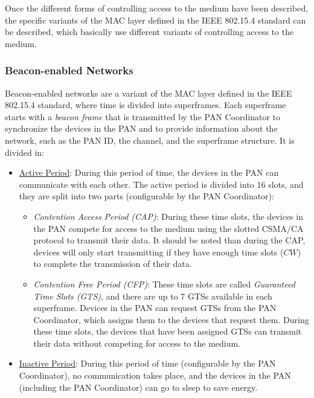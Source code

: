 Once the different forms of controlling access to the medium have been described, the specific variants of the MAC layer defined in the IEEE 802.15.4 standard can be described, which basically use different variants of controlling access to the medium.

\subsubsection{Beacon-enabled Networks}

Beacon-enabled networks are a variant of the MAC layer defined in the IEEE 802.15.4 standard, where time is divided into superframes. Each superframe starts with a \emph{beacon frame} that is transmitted by the PAN Coordinator to synchronize the devices in the PAN and to provide information about the network, such as the PAN ID, the channel, and the superframe structure. It is divided in:
\begin{itemize}
    \item \ul{Active Period}: During this period of time, the devices in the PAN can communicate with each other. The active period is divided into 16 slots, and they are split into two parts (configurable by the PAN Coordinator):
    \begin{itemize}
        \item \emph{Contention Access Period (CAP)}: During these time slots, the devices in the PAN compete for access to the medium using the slotted CSMA/CA protocol to transmit their data. It should be noted than during the CAP, devices will only start transmitting if they have enough time slots ($CW$) to complete the transmission of their data.
        \item \emph{Contention Free Period (CFP)}: These time slots are called \emph{Guaranteed Time Slots (GTS)}, and there are up to 7 GTSs available in each superframe. Devices in the PAN can request GTSs from the PAN Coordinator, which assigns them to the devices that request them. During these time slots, the devices that have been assigned GTSs can transmit their data without competing for access to the medium.
    \end{itemize}
    \item \ul{Inactive Period}: During this period of time (configurable by the PAN Coordinator), no communication takes place, and the devices in the PAN (including the PAN Coordinator) can go to sleep to save energy.
\end{itemize}

